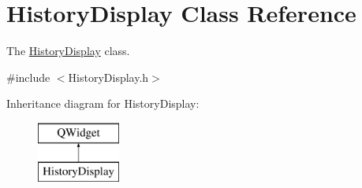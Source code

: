\hypertarget{classHistoryDisplay}{\section{History\-Display Class Reference}
\label{classHistoryDisplay}
}


The \hyperlink{classHistoryDisplay}{History\-Display} class.  




{\ttfamily \#include $<$History\-Display.\-h$>$}

Inheritance diagram for History\-Display\-:\begin{figure}[H]
\begin{center}
\leavevmode
\includegraphics[height=2.000000cm]{classHistoryDisplay}
\end{center}
\end{figure}
